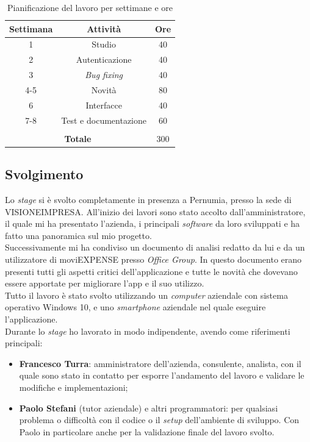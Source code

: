 \renewcommand{\arraystretch}{1.3}
\begin{table}[H]
    \centering
        \begin{tabular}{| c | c | c |} 
        \hline
        \textbf{Settimana} & \textbf{Attività} & \textbf{Ore} \\
        \hline
        1 & Studio & 40 \\ 
        \hline
        2 & Autenticazione & 40 \\
        \hline
        3 & \textit{Bug fixing} & 40 \\
        \hline
        4-5 & Novità & 80 \\
        \hline
        6 & Interfacce & 40 \\
        \hline
        7-8 & Test e documentazione & 60 \\
        \hline
        \multicolumn{3}{c}{\rule{0pt}{1em}} \\
        \hline
        \multicolumn{2}{|c|}{\textbf{Totale}} & 300 \\
        \hline
        \end{tabular}
        \caption{Pianificazione del lavoro per settimane e ore}
\end{table}
\renewcommand{\arraystretch}{1}

\subsection{Svolgimento}

Lo \textit{stage} si è svolto completamente in presenza a Pernumia, presso la sede di VISIONEIMPRESA. All'inizio dei lavori sono stato accolto dall'amministratore, il quale mi ha presentato l'azienda, i principali \textit{software} da loro sviluppati e ha fatto una panoramica sul mio progetto.\\
Successivamente mi ha condiviso un documento di analisi redatto da lui e da un utilizzatore di moviEXPENSE presso \textit{Office Group}. In questo documento erano presenti tutti gli aspetti critici dell'applicazione e tutte le novità che dovevano essere apportate per migliorare l'app e il suo utilizzo.\\
Tutto il lavoro è stato svolto utilizzando un \textit{computer} aziendale con sistema operativo Windows 10, e uno \textit{smartphone} aziendale nel quale eseguire l'applicazione.\\
Durante lo \textit{stage} ho lavorato in modo indipendente, avendo come riferimenti principali:
\begin{itemize}
    \item \textbf{Francesco Turra}: amministratore dell'azienda, consulente, analista, con il quale sono stato in contatto per esporre l'andamento del lavoro e validare le modifiche e implementazioni;
    \item \textbf{Paolo Stefani} (tutor aziendale) e altri programmatori: per qualsiasi problema o difficoltà con il codice o il \textit{setup} dell'ambiente di sviluppo. Con Paolo in particolare anche per la validazione finale del lavoro svolto.
\end{itemize}